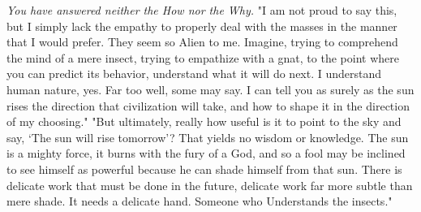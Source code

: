\begin{flushright}
\SmallVSpace
\emph{You have answered neither the How nor the Why.}
\SmallVSpace
"I am not proud to say this, but I simply lack the empathy to properly deal with the masses in the manner that I would prefer. They seem so{\el} Alien to me. Imagine, trying to comprehend the mind of a mere insect, trying to empathize with a gnat, to the point where you can predict its behavior, understand what it will do next. I understand human nature, yes. Far too well, some may say. I can tell you as surely as the sun rises the direction that civilization will take, and how to shape it in the direction of my choosing."
\SomeVSpace
"But ultimately, really how useful is it to point to the sky and say, ‘The sun will rise tomorrow’? That yields no wisdom or knowledge. The sun is a mighty force, it burns with the fury of a God, and so a fool may be inclined to see himself as powerful because he can shade himself from that sun. There is delicate work that must be done in the future, delicate work far more subtle than mere shade. It needs a delicate hand. Someone who{\el} Understands the insects."


\end{flushright}
